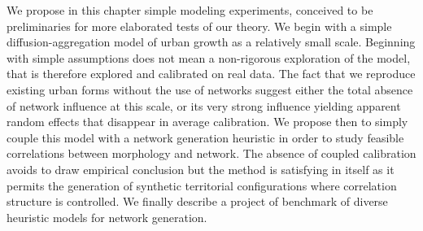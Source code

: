 We propose in this chapter simple modeling experiments, conceived to be preliminaries for more elaborated tests of our theory. We begin with a simple diffusion-aggregation model of urban growth as a relatively small scale. Beginning with simple assumptions does not mean a non-rigorous exploration of the model, that is therefore explored and calibrated on real data. The fact that we reproduce existing urban forms 
 without the use of networks suggest either the total absence of network influence at this scale, or its very strong influence yielding apparent random effects that disappear in average calibration. We propose then to simply couple this model with a network generation heuristic in order to study feasible correlations between morphology and network. The absence of coupled calibration 
  avoids to draw empirical conclusion but the method is satisfying in itself as it permits the generation of synthetic territorial configurations where correlation structure is controlled. We finally describe a project of benchmark of diverse heuristic models for network generation.
















